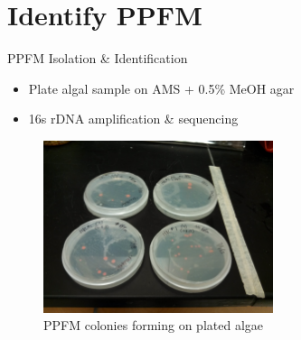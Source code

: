 \documentclass[8pt]{beamer}\usepackage[]{graphicx}\usepackage[]{color}
\begin{document}
\section{Identify PPFM}
\begin{frame}{PPFM Isolation \& Identification}
 \begin{itemize}
 \item Plate algal sample on AMS + 0.5\% MeOH agar
 \item 16s rDNA amplification \& sequencing

    \end{itemize}
\begin{figure}
    \centering
    \includegraphics[width=0.6\textwidth]{./figure/Algae_PPFM_isolation}%
    \caption{PPFM colonies forming on plated algae}
\end{figure}
\end{frame}
\end{document}
